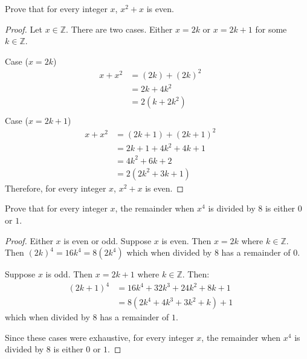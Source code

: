 \begin{tcolorbox}[title=Problem 14, breakable]
    Prove that for every integer $x$, $x^2 + x$ is even.
\end{tcolorbox}

\begin{proof}
    Let $x \in \mathbb{Z}$. There are two cases. Either $x = 2k$
    or $x = 2k + 1$ for some $k \in \mathbb{Z}$.

    Case ($x = 2k$)
    \begin{align*}
        x + x^2 & = (2k) + {(2k)}^2 &  & \\
                & = 2k + 4k^2       &  & \\
                & = 2(k + 2k^2)     &  & \\
    \end{align*}
    Case ($x = 2k + 1$)
    \begin{align*}
        x + x^2 & = (2k + 1) + {(2k + 1)}^2 &  & \\
                & = 2k + 1 + 4k^2 + 4k + 1  &  & \\
                & = 4k^2 + 6k + 2           &  & \\
                & = 2(2k^2 + 3k + 1)
    \end{align*}
    Therefore, for every integer $x$, $x^2 + x$ is even.
\end{proof}

\begin{tcolorbox}[title=Problem 15, breakable]
    Prove that for every integer $x$, the remainder when $x^4$ is divided by $8$
    is either $0$ or $1$.
\end{tcolorbox}

\begin{proof}
    Either $x$ is even or odd.
    Suppose $x$ is even. Then $x = 2k$ where $k \in \mathbb{Z}$.
    Then ${(2k)}^4 = 16k^4 = 8(2k^4)$ which when divided by $8$ has a remainder of $0$.

    Suppose $x$ is odd. Then $x = 2k + 1$ where $k \in \mathbb{Z}$. Then:
    \begin{align*}
        {(2k + 1)}^4 & = 16k^4 + 32k^3 + 24k^2 + 8k + 1  &  & \\
                     & = 8(2k^4 + 4k^3 + 3k^2 + k) + 1 
    \end{align*}
    which when divided by $8$ has a remainder of $1$.

    Since these cases were exhaustive, for every integer $x$, the remainder when
    $x^4$ is divided by $8$ is either $0$ or $1$.
\end{proof}

